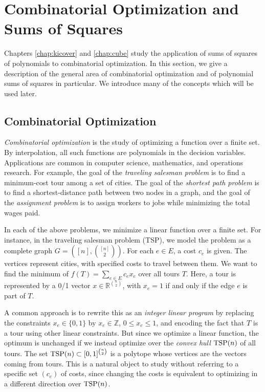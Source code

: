 \section{Combinatorial Optimization and Sums of Squares}
\label{section:cosos}
Chapters \ref{chap:kicover} and \ref{chap:cube} study the application of sums of squares of polynomials to combinatorial optimization. 
In this section, we give a description of the general area of combinatorial optimization and of polynomial sums of squares in particular.
We introduce many of the concepts which will be used later.

\subsection{Combinatorial Optimization}
\label{section:copt}
{\em Combinatorial optimization} is the study of optimizing a function over a finite set. 
By interpolation, all such functions are polynomials in the decision variables.
Applications are common in computer science, mathematics, and operations research.
For example, the goal of the {\em traveling salesman problem} is to find a minimum-cost tour among a set of cities.
The goal of the {\em shortest path problem} is to find a shortest-distance path between two nodes in a graph, and the goal of the {\em assignment problem} is to assign workers to jobs while minimizing the total wages paid. 

In each of the above problems, we minimize a linear function over a finite set.
For instance, in the traveling salesman problem (TSP), we model the problem as a complete graph $G=([n],{ {[n]} \choose 2})$.
For each $e \in E$, a cost $c_e$ is given.
The vertices represent cities, with specified costs to travel between them.
We want to find the minimum of $f(T) = \sum_{e \in E} c_ex_e$ over all tours $T$.
Here, a tour is represented by a 0/1 vector $x \in \mathbb{R}^{n \choose 2}$, with $x_e = 1$ if and only if the edge $e$ is part of $T$.

A common approach is to rewrite this as an {\em integer linear program} by replacing the constraints $x_e \in \{0,1\}$ by $x_e \in \mathbb{Z}$, $0 \le x_e \le 1$, and encoding the fact that $T$ is a tour using other linear constraints.
But since we optimize a linear function, the optimum is unchanged if we instead optimize over the {\em convex hull} $\textup{TSP}(n)$ of all tours.
The set $\textup{TSP}(n) \subset [0,1]^{n \choose 2}$ is a polytope whose vertices are the vectors coming from tours.
This is a natural object to study without referring to a specific set $(c_e)$ of costs, since changing the costs is equivalent to optimizing in a different direction over $\textup{TSP}(n)$.

